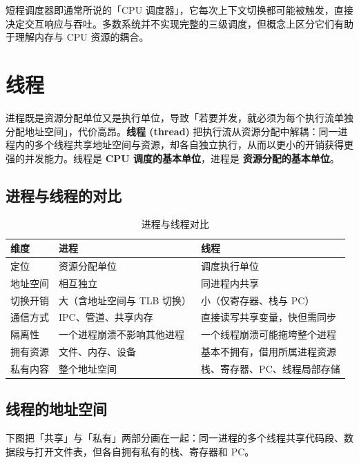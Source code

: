\noindent 短程调度器即通常所说的「CPU 调度器」，它每次上下文切换都可能被触发，直接决定交互响应与吞吐。多数系统并不实现完整的三级调度，但概念上区分它们有助于理解内存与 CPU 资源的耦合。

\section{线程}

\noindent 进程既是资源分配单位又是执行单位，导致「若要并发，就必须为每个执行流单独分配地址空间」，代价高昂。\textbf{线程 (thread)} 把执行流从资源分配中解耦：同一进程内的多个线程共享地址空间与资源，却各自独立执行，从而以更小的开销获得更强的并发能力。线程是 \textbf{CPU 调度的基本单位}，进程是 \textbf{资源分配的基本单位}。

\subsection{进程与线程的对比}

\begin{table}[H]
\centering
\caption{进程与线程对比}
\begin{tabulary}{\textwidth}{LLL}
\toprule
维度 & 进程 & 线程 \\
\midrule
定位 & 资源分配单位 & 调度执行单位 \\
地址空间 & 相互独立 & 同进程内共享 \\
切换开销 & 大（含地址空间与 TLB 切换） & 小（仅寄存器、栈与 PC） \\
通信方式 & IPC、管道、共享内存 & 直接读写共享变量，快但需同步 \\
隔离性 & 一个进程崩溃不影响其他进程 & 一个线程崩溃可能拖垮整个进程 \\
拥有资源 & 文件、内存、设备 & 基本不拥有，借用所属进程资源 \\
私有内容 & 整个地址空间 & 栈、寄存器、PC、线程局部存储 \\
\bottomrule
\end{tabulary}
\end{table}

\subsection{线程的地址空间}

\noindent 下图把「共享」与「私有」两部分画在一起：同一进程的多个线程共享代码段、数据段与打开文件表，但各自拥有私有的栈、寄存器和 PC。

